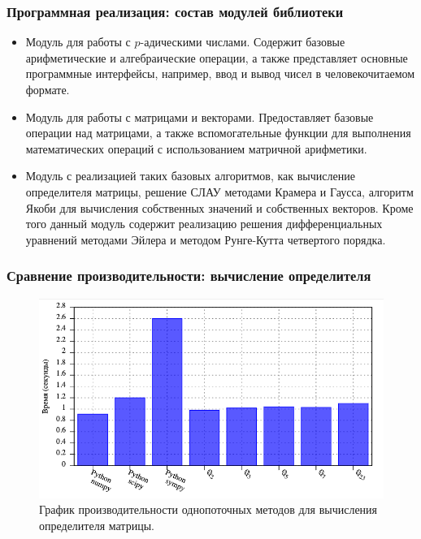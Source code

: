 \documentclass[10pt,professionalfont,utf8,presentation,compress]{beamer}
\theoremstyle{definition}
\theoremstyle{plain}
\begin{document}
\begin{frame}
\frametitle{Программная реализация: состав модулей библиотеки}
\begin{itemize}
\item Модуль для работы с $p$-адическими числами. Содержит базовые арифметические и алгебраические операции, а также представляет основные программные интерфейсы, например, ввод и вывод чисел в человекочитаемом формате.
\item Модуль для работы с матрицами и векторами. Предоставляет базовые операции над матрицами, а также вспомогательные функции для выполнения математических операций с использованием матричной арифметики.
\item Модуль с реализацией таких базовых алгоритмов, как вычисление определителя матрицы, решение СЛАУ методами Крамера и Гаусса, алгоритм Якоби для вычисления собственных значений и собственных векторов. Кроме того данный модуль содержит реализацию решения дифференциальных уравнений методами Эйлера и методом Рунге-Кутта четвертого порядка.
\end{itemize}
\end{frame}


\begin{frame}
\frametitle{Сравнение производительности: вычисление определителя}
\begin{figure}[H]
\centerline{\includegraphics[width=0.95\linewidth]{../gnuplot/single/det/plot.png}}
\caption{График производительности однопоточных методов для вычисления определителя матрицы.}
\label{img:single:det:1}
\end{figure}
\end{frame}
\end{document}
